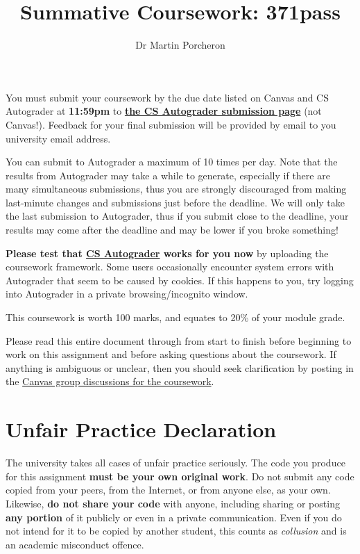 \documentclass[a4paper]{article}
\title{Summative Coursework: 371pass}
\author{Dr Martin Porcheron}
\date{}
\newcommand\autograderlink{\href{https://csautograder.swansea.ac.uk/}{CS Autograder}}
\newcommand\submissionlink{\href{https://csautograder.swansea.ac.uk/web/project/31}{the CS Autograder submission page}}
\begin{document}
\maketitle


You must submit your coursework by the due date listed on Canvas and CS Autograder at \textbf{11:59pm} to \textbf{\submissionlink{}} (not Canvas!). Feedback for your final submission will be provided by email to you university email address.

You can submit to Autograder a maximum of 10 times per day. Note that the results from Autograder may take a while to generate, especially if there are many simultaneous submissions, thus you are strongly discouraged from making last‑minute changes and submissions just before the deadline. We will only take the last submission to Autograder, thus if you submit close to the deadline, your results may come after the deadline and may be lower if you broke something!

\textbf{Please test that \autograderlink{} works for you now} by uploading the coursework framework. Some users occasionally encounter system errors with Autograder that seem to be caused by cookies. If this happens to you, try logging into Autograder in a private browsing/incognito window.

This coursework is worth 100 marks, and equates to 20\% of your module grade.

Please read this entire document through from start to finish before beginning to work on this assignment and before asking questions about the coursework. If anything is ambiguous or unclear, then you should seek clarification by posting in the \href{https://canvas.swansea.ac.uk/courses/24793/discussion_topics/217912}{Canvas group discussions for the coursework}.





\section*{Unfair Practice Declaration}\label{sec:unfair-practice}
The university takes all cases of unfair practice seriously. The code you produce for this assignment \textbf{must be your own original work}. Do not submit any code copied from your peers, from the Internet, or from anyone else, as your own. Likewise, \textbf{do not share your code} with anyone, including sharing or posting \textbf{any portion} of it publicly or even in a private communication. Even if you do not intend for it to be copied by another student, this counts as \emph{collusion} and is an academic misconduct offence.
\end{document}
